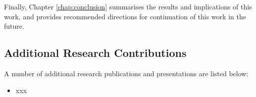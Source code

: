 Finally, Chapter \ref{chap:conclusion} summarises the results and implications of this work, and provides recommended directions for continuation of this work in the future.

\subsection{Additional Research Contributions}


A number of additional research publications and presentations are listed below:

\begin{itemize}
\item xxx
\end{itemize}

